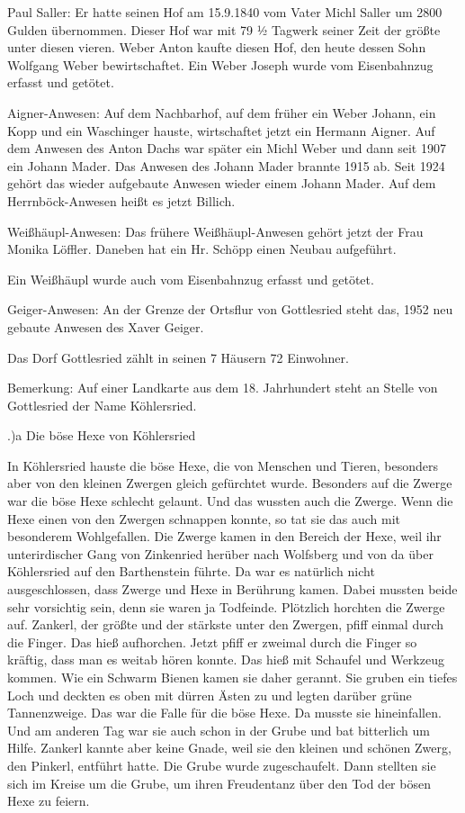 Paul Saller: Er hatte seinen Hof am 15.9.1840 vom Vater Michl Saller um 2800
Gulden übernommen. Dieser Hof war mit 79 ½ Tagwerk seiner Zeit der größte unter
diesen vieren. Weber Anton kaufte diesen Hof, den heute dessen Sohn Wolfgang
Weber bewirtschaftet. Ein Weber Joseph wurde vom Eisenbahnzug erfasst und
getötet.



Aigner-Anwesen: Auf dem Nachbarhof, auf dem früher ein Weber Johann, ein Kopp
und ein Waschinger hauste, wirtschaftet jetzt ein Hermann Aigner. Auf dem
Anwesen des Anton Dachs war später ein Michl Weber und dann seit 1907 ein Johann
Mader. Das Anwesen des Johann Mader brannte 1915 ab. Seit 1924 gehört das wieder
aufgebaute Anwesen wieder einem Johann Mader. Auf dem Herrnböck-Anwesen heißt es
jetzt Billich.

Weißhäupl-Anwesen: Das frühere Weißhäupl-Anwesen gehört jetzt der Frau Monika
Löffler. Daneben hat ein Hr. Schöpp einen Neubau aufgeführt.

Ein Weißhäupl wurde auch vom Eisenbahnzug erfasst und getötet.

Geiger-Anwesen: An der Grenze der Ortsflur von Gottlesried steht das, 1952 neu
gebaute Anwesen des Xaver Geiger.

Das Dorf Gottlesried zählt in seinen 7 Häusern 72 Einwohner.

Bemerkung: Auf einer Landkarte aus dem 18. Jahrhundert steht an Stelle von
Gottlesried der Name Köhlersried.

.)a Die böse Hexe von Köhlersried

In Köhlersried hauste die böse Hexe, die von Menschen und Tieren, besonders aber
von den kleinen Zwergen gleich gefürchtet wurde. Besonders auf die Zwerge war
die böse Hexe schlecht gelaunt. Und das wussten auch die Zwerge. Wenn die Hexe
einen von den Zwergen schnappen konnte, so tat sie das auch mit besonderem
Wohlgefallen. Die Zwerge kamen in den Bereich der Hexe, weil ihr unterirdischer
Gang von Zinkenried herüber nach Wolfsberg und von da über Köhlersried auf den
Barthenstein führte. Da war es natürlich nicht ausgeschlossen, dass Zwerge und
Hexe in Berührung kamen. Dabei mussten beide sehr vorsichtig sein, denn sie
waren ja Todfeinde. Plötzlich horchten die Zwerge auf. Zankerl, der größte und
der stärkste unter den Zwergen, pfiff einmal durch die Finger. Das hieß
aufhorchen. Jetzt pfiff er zweimal durch die Finger so kräftig, dass man es
weitab hören konnte. Das hieß mit Schaufel und Werkzeug kommen. Wie ein Schwarm
Bienen kamen sie daher gerannt. Sie gruben ein tiefes Loch und deckten es oben
mit dürren Ästen zu und legten darüber grüne Tannenzweige. Das war die Falle für
die böse Hexe. Da musste sie hineinfallen. Und am anderen Tag war sie auch schon
in der Grube und bat bitterlich um Hilfe. Zankerl kannte aber keine Gnade, weil
sie den kleinen und schönen Zwerg, den Pinkerl, entführt hatte. Die Grube wurde
zugeschaufelt. Dann stellten sie sich im Kreise um die Grube, um ihren
Freudentanz über den Tod der bösen Hexe zu feiern.


